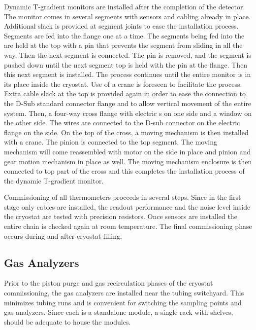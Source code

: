 Dynamic T-gradient monitors are installed after the completion of the detector.
The monitor comes in several segments with sensors and cabling already
in place. Additional slack is provided at segment joints to ease the
installation process. Segments are fed into the flange one at a 
time. The segments being fed into the  are held at the top
with a pin that prevents the segment from sliding in all the way. Then the next
segment is connected. The pin is removed, and the
segment is pushed down until the next segment top is held with the
pin at the flange. Then this next segment is installed. The
process  continues until the entire monitor is in its place
inside the cryostat. Use of a crane is foreseen to facilitate the process.
Extra cable slack at the top is provided again in order to ease  the
connection to the D-Sub standard connector flange and to allow  vertical movement of the
entire system. Then, a four-way cross flange with electric \fdth{}s on
one side and a window on the other side. The wires are connected to
the D-sub connector on the electric flange \fdth on the side. On the
top of the cross, a moving mechanism is then installed with a crane.
The pinion is connected to the top segment. The moving mechanism will
come reassembled with motor on the side in place and pinion and gear
motion mechanism in place as well. The moving mechanism enclosure  is then connected to top part of the cross and this completes the
installation process of the dynamic T-gradient monitor.

Commissioning of all thermometers proceeds in several steps. Since in the first stage only cables are installed,
the readout performance and the noise level inside the cryostat are
tested with precision resistors. Once sensors are installed the entire chain is checked again at room temperature.
The final commissioning phase occurs during and after cryostat filling.  


\subsection{Gas Analyzers}
\label{sec:fdgen-slow-cryo-install-ga}
 
Prior to the piston purge and gas recirculation phases of the cryostat commissioning, the gas analyzers are installed near the %
tubing switchyard. This minimizes tubing runs and is  convenient for switching the sampling points and gas analyzers. Since each is a standalone module, a single rack with shelves, should be adequate to house the modules.

